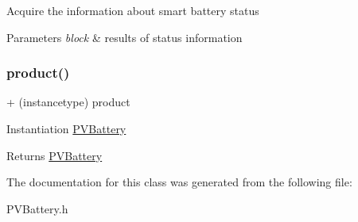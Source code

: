 Acquire the information about smart battery status


\begin{DoxyParams}{Parameters}
{\em block} & results of status information \\
\hline
\end{DoxyParams}
\mbox{\label{interface_p_v_battery_ab535021632652493bcf2decadff6bc78}} 
\subsubsection{\texorpdfstring{product()}{product()}}
{\footnotesize\ttfamily + (instancetype) product \begin{DoxyParamCaption}{ }\end{DoxyParamCaption}}

Instantiation \hyperlink{interface_p_v_battery}{P\+V\+Battery}

\begin{DoxyReturn}{Returns}
\hyperlink{interface_p_v_battery}{P\+V\+Battery} 
\end{DoxyReturn}


The documentation for this class was generated from the following file\+:\begin{DoxyCompactItemize}
\item 
P\+V\+Battery.\+h\end{DoxyCompactItemize}

